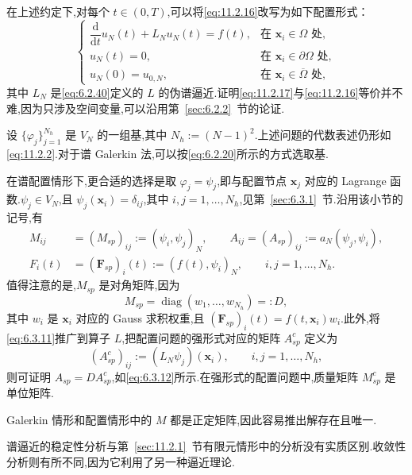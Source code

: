 在上述约定下,对每个 \(t\in(0,T)\),可以将\eqref{eq:11.2.16}改写为如下配置形式：
\begin{equation}\label{eq:11.2.17}
  \begin{cases}
    \dfrac{\mathrm d}{\mathrm dt}u_N(t)+L_Nu_N(t)=f(t),
         &\text{在 }\boldsymbol{x}_i\in\Omega\text{ 处},\\
    u_N(t)=0,&\text{在 }\boldsymbol{x}_i\in\partial\Omega\text{ 处},\\
    u_N(0)=u_{0,N},&\text{在 }\boldsymbol{x}_i\in\overline\Omega\text{ 处},
  \end{cases}
\end{equation}
其中 \(L_N\) 是\eqref{eq:6.2.40}定义的 \(L\) 的伪谱逼近.证明\eqref{eq:11.2.17}与\eqref{eq:11.2.16}等价并不难,因为只涉及空间变量,可以沿用第~\ref{sec:6.2.2}~节的论证.

设 \(\{\varphi_j\}_{j=1}^{N_h}\) 是 \(V_N\) 的一组基,其中 \(N_h:=(N-1)^2\).上述问题的代数表述仍形如\eqref{eq:11.2.2}.对于谱 Galerkin 法,可以按\eqref{eq:6.2.20}所示的方式选取基.

在谱配置情形下,更合适的选择是取 \(\varphi_j=\psi_j\),即与配置节点 \(\boldsymbol{x}_j\) 对应的 Lagrange 函数.\(\psi_j\in V_N\),且 \(\psi_j(\boldsymbol{x}_i)=\delta_{ij}\),其中 \(i,j=1,\ldots,N_h\),见第~\ref{sec:6.3.1}~节.沿用该小节的记号,有
\begin{equation}\label{eq:11.2.18}
  \begin{aligned}
    M_{ij}&=(M_{sp})_{ij}:=(\psi_i,\psi_j)_N,\qquad
       A_{ij}=(A_{sp})_{ij}:=a_N(\psi_j,\psi_i),\\
    F_i(t)&=(\boldsymbol{F}_{sp})_i(t):=(f(t),\psi_i)_N,\qquad i,j=1,\ldots,N_h .
  \end{aligned}
\end{equation}
值得注意的是,\(M_{sp}\) 是对角矩阵,因为
\[
  M_{sp}=\operatorname{diag}(w_1,\ldots,w_{N_h})=:D,
\]
其中 \(w_i\) 是 \(\boldsymbol{x}_i\) 对应的 Gauss 求积权重,且 \((\boldsymbol{F}_{sp})_i(t)=f(t,\boldsymbol{x}_i)w_i\).此外,将\eqref{eq:6.3.11}推广到算子 \(L\),把配置问题的强形式对应的矩阵 \(A_{sp}^c\) 定义为
\[
  (A_{sp}^c)_{ij}:=(L_N\psi_j)(\boldsymbol{x}_i),\qquad i,j=1,\ldots,N_h,
\]
则可证明 \(A_{sp}=DA_{sp}^c\),如\eqref{eq:6.3.12}所示.在强形式的配置问题中,质量矩阵 \(M_{sp}^c\) 是单位矩阵.

Galerkin 情形和配置情形中的 \(M\) 都是正定矩阵,因此容易推出解存在且唯一.

谱逼近的稳定性分析与第~\ref{sec:11.2.1}~节有限元情形中的分析没有实质区别.收敛性分析则有所不同,因为它利用了另一种逼近理论.

